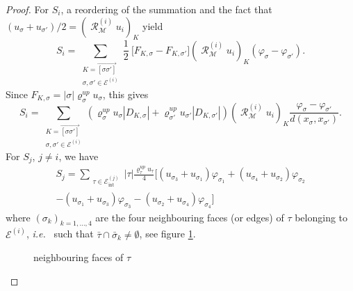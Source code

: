 \documentclass{amsart}
\numberwithin{equation}{section}
\begin{document}
\begin{proof}
For $S_i$, a reordering of the summation and the fact that $(u_{{\sigma}} + u_{{{\sigma}}'})/2 = (\operatorname{{\mathcal{R}}}_{{\mathcal M}}^{(i)}u_i)_K$  yield
  \[
    S_i  = \sum_{\substack{K =  \overrightarrow{[{{\sigma}} {{\sigma}}']}\\ {{\sigma}}, {{\sigma}}' \in {\mathcal {E}^{(i)}}}}
     \frac 1 2 \ \bigl[ F_{K,{{\sigma}}}- F_{K,{{\sigma}}'} \bigr]  (\operatorname{{\mathcal{R}}}_{{\mathcal M}}^{(i)}u_i)_K (\varphi_{{\sigma}} - \varphi_{{{\sigma}}'}).
  \]
Since $F_{K,{{\sigma}}}=|{{\sigma}}| {\varrho}_{{\sigma}}^{up} u_{{\sigma}}$, this gives
  \[
    S_i  = \sum_{\substack{K =  \overrightarrow{[{{\sigma}} {{\sigma}}']}\\ {{\sigma}}, {{\sigma}}' \in {\mathcal {E}^{(i)}}}}
    ({\varrho}_{{\sigma}}^{up} u_{{\sigma}} |D_{ K,{{\sigma}}}| + {\varrho}_{{{\sigma}}'}^{up} u_{{{\sigma}}'} |D_{ K,{{\sigma}}'}|)(\operatorname{{\mathcal{R}}}_{{\mathcal M}}^{(i)}u_i)_K
    \frac {\varphi_{{\sigma}} - \varphi_{{{\sigma}}'}}{d(x_{{\sigma}}, x_{{{\sigma}}'})}.
  \]
For $S_j$, $j \ne i$, we have 
  \begin{multline*}
    S_{j} = 
    \sum_{\substack{{\tau} \in {{\mathcal E}_{\mathrm{int}}^{(j)}}}}   |{\tau} | \frac{ {\varrho}^{up}_{\tau} u_{\tau}}{4}   \big[\left(   {u_{{{\sigma}}_3}+u_{{{\sigma}}_1}}\right) \varphi_{{{\sigma}}_1} +  \left(   {u_{{{\sigma}}_4}+u_{{{\sigma}}_2}}\right) \varphi_{{{\sigma}}_2} 
    \\
    - \left(   {u_{{{\sigma}}_1}+u_{{{\sigma}}_3}}\right) \varphi_{{{\sigma}}_3}-  \left(   {u_{{{\sigma}}_2}+u_{{{\sigma}}_4}}\right) \varphi_{{{\sigma}}_4}\big]
    \end{multline*}
    where $({{\sigma}}_k)_{k=1,\ldots,4}$ are the four neighbouring faces (or edges) of ${\tau}$ belonging to ${\mathcal {E}^{(i)}}$, {\emph{i.e.\/}} \ such that $\bar {\tau} \cap \bar {{\sigma}}_k \not = \emptyset$, see figure \ref{fig-tau}.
\begin{figure}[hbt]
\centering
{}
\caption{neighbouring faces of ${\tau}$}
\label{fig-tau}
\end{figure}


\end{proof}
\end{document}
